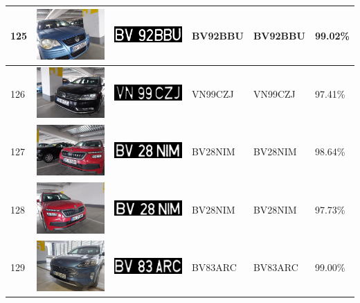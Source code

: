 \documentclass[a4paper,12pt]{report}
\begin{document}
\begin{longtable}{| m{0.6cm} | m{3cm} | m{3cm} | m{1.8cm} | m{1.8cm} | m{1.8cm} |}
        125 & \includegraphics[width=3cm,keepaspectratio]{dataset/73_s1.jpg} & \includegraphics[width=3cm,keepaspectratio]{segmentari/125.jpg} & BV92BBU & BV92BBU & 99.02\% \\ \hline
        126 & \includegraphics[width=3cm,keepaspectratio]{dataset/74_d1.jpg} & \includegraphics[width=3cm,keepaspectratio]{segmentari/126.jpg} & VN99CZJ & VN99CZJ & 97.41\% \\ \hline
        127 & \includegraphics[width=3cm,keepaspectratio]{dataset/75_d1.jpg} & \includegraphics[width=3cm,keepaspectratio]{segmentari/127.jpg} & BV28NIM & BV28NIM & 98.64\% \\ \hline
        128 & \includegraphics[width=3cm,keepaspectratio]{dataset/75_s1.jpg} & \includegraphics[width=3cm,keepaspectratio]{segmentari/128.jpg} & BV28NIM & BV28NIM & 97.73\% \\ \hline
        129 & \includegraphics[width=3cm,keepaspectratio]{dataset/76_d1.jpg} & \includegraphics[width=3cm,keepaspectratio]{segmentari/129.jpg} & BV83ARC & BV83ARC & 99.00\% \\ \hline

\end{longtable}
\end{document}

